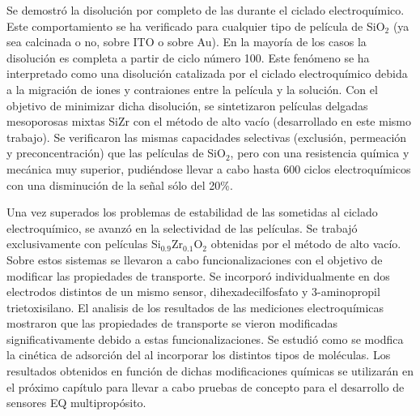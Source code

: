 	Se demostró la disolución por completo de las \pdmF\space durante el ciclado electroquímico. Este comportamiento se ha verificado para cualquier tipo de película de SiO$_2$ (ya sea calcinada o no, sobre ITO o sobre Au). En la mayoría de los casos la disolución es completa a partir de ciclo número 100. Este fenómeno se ha interpretado como una disolución catalizada por el ciclado electroquímico debida a la migración de iones y contraiones entre la película y la solución. Con el objetivo de minimizar dicha disolución, se sintetizaron películas delgadas mesoporosas mixtas Si\textbar Zr con el método de alto vacío (desarrollado en este mismo trabajo). Se verificaron las mismas capacidades selectivas (exclusión, permeación y preconcentración) que las películas de SiO$_2$, pero con una resistencia química y mecánica muy superior, pudiéndose llevar a cabo hasta 600 ciclos electroquímicos con una disminución de la señal sólo del 20\%.

	Una vez superados los problemas de estabilidad de las \pdm\space sometidas al ciclado electroquímico, se avanzó en la selectividad de las películas. Se trabajó exclusivamente con películas Si$_{0.9}$Zr$_{0.1}$O$_2$ obtenidas por el método de alto vacío. Sobre estos sistemas se llevaron a cabo funcionalizaciones con el objetivo de modificar las propiedades de transporte. Se incorporó individualmente en dos electrodos distintos de un mismo sensor, dihexadecilfosfato y 3-aminopropil trietoxisilano. El analisis de los resultados de las mediciones electroquímicas mostraron que las propiedades de transporte se vieron modificadas significativamente debido a estas funcionalizaciones. Se estudió como se modfica la cinética de adsorción del \aminorutenio\space al incorporar los distintos tipos de moléculas. Los resultados obtenidos en función de dichas modificaciones químicas se utilizarán en el próximo capítulo para llevar a cabo pruebas de concepto para el desarrollo de sensores EQ multipropósito.

